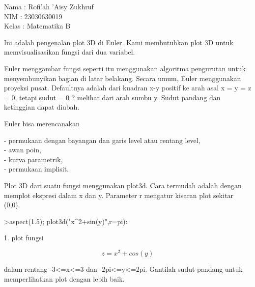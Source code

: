 \documentclass{article}
\begin{document}
\begin{eulernotebook}
\begin{eulercomment}
Nama  : Rofi'ah 'Aisy Zukhruf\\
NIM   : 23030630019\\
Kelas : Matematika B\\
\end{eulercomment}
\eulersubheading{}
\begin{eulercomment}
\begin{eulercomment}
\begin{eulercomment}
Ini adalah pengenalan plot 3D di Euler. Kami membutuhkan plot 3D untuk
memvisualisasikan fungsi dari dua variabel.

Euler menggambar fungsi seperti itu menggunakan algoritma pengurutan
untuk menyembunyikan bagian di latar belakang. Secara umum, Euler
menggunakan proyeksi pusat. Defaultnya adalah dari kuadran x-y positif
ke arah asal x = y = z = 0, tetapi sudut = 0 ? melihat dari arah sumbu
y. Sudut pandang dan ketinggian dapat diubah.

Euler bisa merencanakan

- permukaan dengan bayangan dan garis level atau rentang level,\\
- awan poin,\\
- kurva parametrik,\\
- permukaan implisit.

Plot 3D dari suatu fungsi menggunakan plot3d. Cara termudah adalah
dengan memplot ekspresi dalam x dan y. Parameter r mengatur kisaran
plot sekitar (0,0).
\end{eulercomment}
\begin{eulerprompt}
>aspect(1.5); plot3d("x^2+sin(y)",r=pi):
\end{eulerprompt}
\begin{eulercomment}
1. plot fungsi

\end{eulercomment}
\begin{eulerformula}
\[
z=x^2 + cos(y)
\]
\end{eulerformula}
\begin{eulercomment}
dalam rentang -3\textless{}=x\textless{}=3 dan -2pi\textless{}=y\textless{}=2pi. Gantilah sudut pandang untuk
memperlihatkan plot dengan lebih baik.


\end{eulercomment}
\end{eulercomment}
\end{eulercomment}
\end{eulernotebook}
\end{document}
